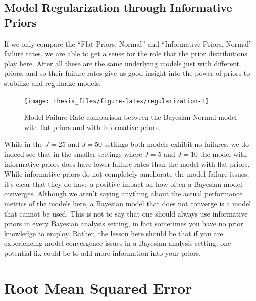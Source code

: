 \documentclass[12pt,twoside]{reedthesis}
\begin{document}
\hypertarget{model-regularization-through-informative-priors}{%
\subsection{Model Regularization through Informative Priors}\label{model-regularization-through-informative-priors}}

If we only compare the ``Flat Priors, Normal'' and ``Informative Priors, Normal'' failure rates, we are able to get a sense for the role that the prior distributions play here. After all these are the same underlying models just with different priors, and so their failure rates give us good insight into the power of priors to stabilize and regularize models.
\begin{figure}

{\centering \texttt{[image: thesis\_files/figure-latex/regularization-1]} 

}

\caption{Model Failure Rate comparison between the Bayesian Normal model with flat priors and with informative priors.}\label{fig:regularization}
\end{figure}
While in the \(J = 25\) and \(J = 50\) settings both models exhibit no failures, we do indeed see that in the smaller settings where \(J = 5\) and \(J = 10\) the model with informative priors does have lower failure rates than the model with flat priors. While informative priors do not completely ameliorate the model failure issues, it's clear that they do have a positive impact on how often a Bayesian model converges. Although we aren't saying anything about the actual performance metrics of the models here, a Bayesian model that does not converge is a model that cannot be used. This is not to say that one should always use informative priors in every Bayesian analysis setting, in fact sometimes you have no prior knowledge to employ. Rather, the lesson here should be that if you are experiencing model convergence issues in a Bayesian analysis setting, one potential fix could be to add more information into your priors.

\hypertarget{root-mean-squared-error}{%
\section{Root Mean Squared Error}\label{root-mean-squared-error}}
\end{document}
